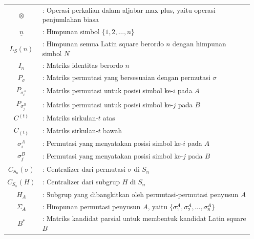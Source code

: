 \begin{longtable}{c p{14cm}}
  $\otimes$                  & : Operasi perkalian dalam aljabar max-plus, yaitu operasi penjumlahan biasa              \\
  $\underline{n}$            & : Himpunan simbol $\{1,2,\ldots,n\}$                                                     \\
  $L_S(n)$                   & : Himpunan semua Latin square berordo $n$ dengan himpunan simbol $N$                     \\
  $I_n$                      & : Matriks identitas berordo $n$                                                          \\
  $P_\sigma$                 & : Matriks permutasi yang bersesuaian dengan permutasi $\sigma$                           \\
  $P_{\sigma_i^A}$           & : Matriks permutasi untuk posisi simbol ke-$i$ pada $A$                                  \\
  $P_{\sigma_j^B}$           & : Matriks permutasi untuk posisi simbol ke-$j$ pada $B$                                  \\
  $C^{(t)}$                  & : Matriks sirkulan-$t$ atas                                                              \\
  $C_{(t)}$                  & : Matriks sirkulan-$t$ bawah                                                             \\
  $\sigma_i^A$               & : Permutasi yang menyatakan posisi simbol ke-$i$ pada $A$                                \\
  $\sigma_j^B$               & : Permutasi yang menyatakan posisi simbol ke-$j$ pada $B$                                \\
  $C_{S_n}(\sigma)$          & : Centralizer dari permutasi $\sigma$ di $S_n$                                           \\
  $C_{S_n}(H)$               & : Centralizer dari subgrup $H$ di $S_n$                                                  \\
  $H_A$                      & : Subgrup yang dibangkitkan oleh permutasi-permutasi penyusun $A$                        \\
  $\Sigma_A$                 & : Himpunan permutasi penyusun $A$, yaitu $\{\sigma_1^A,\sigma_2^A,\ldots,\sigma_n^A\}$   \\
  $B^*$                      & : Matriks kandidat parsial untuk membentuk kandidat Latin square $B$                     \\

\end{longtable}
